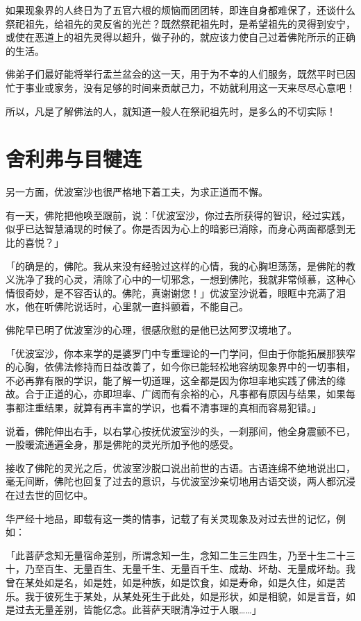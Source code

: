 \documentclass[12pt,twoside,openany]{book}
\begin{document}
如果现象界的人终日为了五官六根的烦恼而团团转，即连自身都难保了，还谈什么祭祀祖先，给祖先的灵反省的光芒？既然祭祀祖先时，是希望祖先的灵得到安宁，或使在恶道上的祖先灵得以超升，做子孙的，就应该力使自己过着佛陀所示的正确的生活。

佛弟子们最好能将举行盂兰盆会的这一天，用于为不幸的人们服务，既然平时已因忙于事业或家务，没有足够的时间来贡献己力，不妨就利用这一天来尽尽心意吧！

所以，凡是了解佛法的人，就知道一般人在祭祀祖先时，是多么的不切实际！

\section{舍利弗与目犍连}\label{sec3.17}

另一方面，优波室沙也很严格地下着工夫，为求正道而不懈。

有一天，佛陀把他唤至跟前，说：「优波室沙，你过去所获得的智识，经过实践，似乎已达智慧涌现的时候了。你是否因为心上的暗影已消除，而身心两面都感到无比的喜悦？」

「的确是的，佛陀。我从来没有经验过这样的心情，我的心胸坦荡荡，是佛陀的教义洗净了我的心灵，清除了心中的一切邪念，一想到佛陀，我就非常倾慕，这种心情很奇妙，是不容否认的。佛陀，真谢谢您！」优波室沙说着，眼眶中充满了泪水，他在听佛陀说话时，心里就一直抖颤着，不能自己。

佛陀早已明了优波室沙的心理，很感欣慰的是他已达阿罗汉境地了。

「优波室沙，你本来学的是婆罗门中专重理论的一门学问，但由于你能拓展那狭窄的心胸，依佛法修持而日益改善了，如今你已能轻松地容纳现象界中的一切事相，不必再靠有限的学识，能了解一切道理，这全都是因为你坦率地实践了佛法的缘故。合于正道的心，亦即坦率、广阔而有余裕的心，凡事都有原因与结果，如果每事都注重结果，就算有再丰富的学识，也看不清事理的真相而容易犯错。」

说着，佛陀伸出右手，以右掌心按抚优波室沙的头，一刹那间，他全身震颤不已，一股暖流通遍全身，那是佛陀的灵光所加予他的感受。

接收了佛陀的灵光之后，优波室沙脱口说出前世的古语。古语连绵不绝地说出口，毫无间断，佛陀也回复了过去的意识，与优波室沙亲切地用古语交谈，两人都沉浸在过去世的回忆中。

华严经十地品，即载有这一类的情事，记载了有关灵现象及对过去世的记忆，例如：

「此菩萨念知无量宿命差别，所谓念知一生，念知二生三生四生，乃至十生二十三十，乃至百生、无量百生、无量千生、无量百千生、成劫、坏劫、无量成坏劫。我曾在某处如是名，如是姓，如是种族，如是饮食，如是寿命，如是久住，如是苦乐。我于彼死生于某处，从某处死生于此处，如是形状，如是相貌，如是言音，如是过去无量差别，皆能亿念。此菩萨天眼清净过于人眼……」
\end{document}
